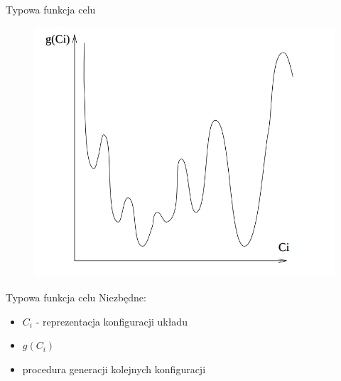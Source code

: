 
	\begin{frame}{Typowa funkcja celu}
		\begin{figure}
			\includegraphics[height=0.9\textheight]{img/18/target_fun}
		\end{figure}
	\end{frame}	
	

	\begin{frame}{Typowa funkcja celu}
		Niezbędne:
		\begin{itemize}
			\item $C_i$ - reprezentacja konfiguracji układu
			\item $g(C_i)$
			\item procedura generacji kolejnych konfiguracji
		\end{itemize}
	\end{frame}	
	
	
